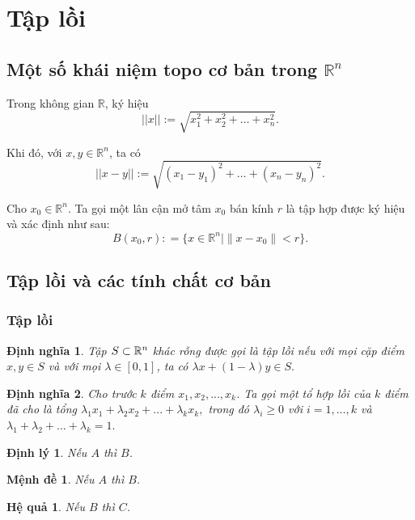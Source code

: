 \documentclass[12pt,a4paper]{report}
\newtheorem{dn}{Định nghĩa}[chapter]
\newtheorem{dl}{Định lý}[chapter]
\newtheorem{md}{Mệnh đề}[chapter]
\newtheorem{hq}{Hệ quả}[chapter]
\begin{document}
\section{ Tập lồi }
\subsection{ Một số khái niệm topo cơ bản trong $\mathbb{R}^n$ }
	Trong không gian $\mathbb {R}$, ký hiệu 
		$$|| x ||:=\sqrt {x_1^2 + x_2^2 + \ldots + x_n^2 }.$$
		
		
	Khi đó, với $x,y \in \mathbb{R}^n$, ta có
	$$|| x-y ||:=\sqrt {(x_1-y_1)^2 + \ldots + (x_n-y_n)^2}.$$
	
	Cho ${x_0} \in {\mathbb{R}^n}$. Ta gọi một lân cận mở tâm ${x_0}$ bán kính $r$ là tập hợp được ký hiệu và xác định như sau:
	$$
	B (x_0, r): = \{ x \in \mathbb{R}^n \mid \| x - x_0 \| < r \}.
	$$ 





\subsection{ Tập lồi và các tính chất cơ bản }
\subsubsection{ Tập lồi}
\begin{dn}
	Tập $S \subset {\Bbb{R}^n}$ khác rỗng được gọi là tập lồi nếu với mọi cặp điểm $x,y \in S$ và với mọi $\lambda  \in \left[ {0,1} \right]$, ta có $\lambda x + \left( {1 - \lambda } \right)y \in S.$
\end{dn}
\begin{dn}
	Cho trước $k$ điểm ${x_1},{x_2},...,{x_k}$. Ta gọi một tổ hợp lồi của $k$ điểm đã cho là tổng
	${\lambda _1}{x_1} + {\lambda _2}{x_2} + ... + {\lambda _k}{x_k},$ trong đó ${\lambda _i} \ge 0$ với $i=1,...,k$ và ${\lambda _1} + {\lambda _2} + ... + {\lambda _k} = 1.$
\end{dn}

\begin{dl}{\rm \cite[Định lý 3.2, trang 245]{Mat}} Nếu $A$ thì $B$.
\end{dl}

\begin{md}{\rm \cite[Bổ đề 3.6]{Sonkim}} Nếu $A$ thì $B$.
\end{md}

\begin{hq}{\rm \cite[Định lý 1.7]{Gab1}} Nếu $B$ thì $C$.
\end{hq}
\end{document}
